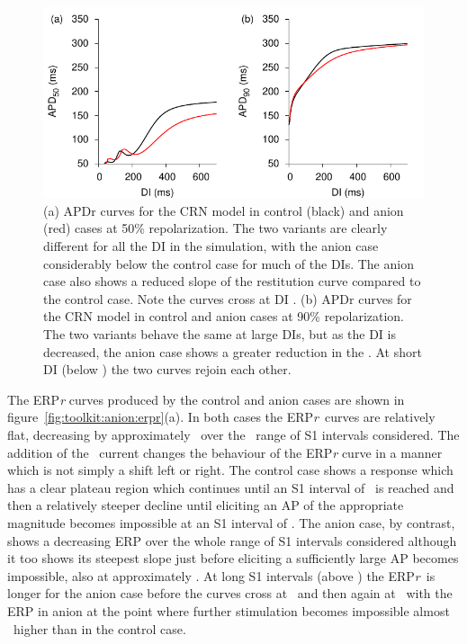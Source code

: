 \begin{figure}
\begin{center}
\includegraphics{figures/toolkit/anion/figures/02_APDR}
\end{center}
\caption[Anion Current APD Restitution]{
\label{fig:tookit:anion:apdr}
(a)
APDr curves for the CRN model in control (black) and anion (red) cases at 50\%
repolarization.
The two variants are clearly different for all the DI in the simulation,
with the anion case considerably below the control case for much of the DIs.
The anion case also shows a reduced slope of the restitution curve compared to
the control case.  Note the curves cross at DI .
(b)
APDr curves for the CRN model in control and anion cases at 90\% repolarization.
The two variants behave the same at large DIs, but as the DI is decreased, the
anion case shows a greater reduction in the \apd.
At short DI (below ) the two curves rejoin each other.
}
\end{figure}


The ERP\emph{r} curves produced by the control and anion cases are shown in
figure~\ref{fig:toolkit:anion:erpr}(a).
In both cases the ERP\emph{r}\ curves are relatively
flat, decreasing by approximately \ over the \ range of S1
intervals considered.  The addition of the \ current changes the
behaviour of the ERP\emph{r} curve in a manner which is not simply a shift left
or right.  The control case shows a response which has a clear plateau region
which continues until an S1 interval of \ is reached and then a
relatively steeper decline until eliciting an AP of the appropriate magnitude
becomes impossible at an S1 interval of .  The anion case, by contrast,
shows a decreasing ERP over the whole range of S1 intervals considered although
it too shows its steepest slope just before eliciting a sufficiently large AP
becomes impossible, also at approximately .  At long S1 intervals (above
) the ERP\emph{r}\ is longer for the anion case before the curves cross
at \  and then again at \ with the ERP in anion at the point
where further stimulation becomes impossible almost \ higher than in the
control case.

